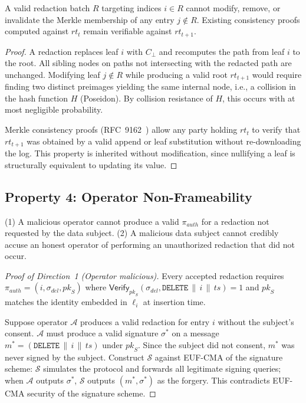 \begin{theorem}
  A valid redaction batch $R$ targeting indices $i \in R$ cannot modify,
  remove, or invalidate the Merkle membership of any entry $j \notin R$.
  Existing consistency proofs computed against $\mathit{rt}_t$ remain
  verifiable against $\mathit{rt}_{t+1}$.
\end{theorem}

\begin{proof}
A redaction replaces leaf $i$ with $C_{\bot}$ and recomputes the path
from leaf $i$ to the root. All sibling nodes on paths not intersecting
with the redacted path are unchanged. Modifying leaf $j \notin R$ while
producing a valid root $\mathit{rt}_{t+1}$ would require finding two
distinct preimages yielding the same internal node, i.e., a collision in
the hash function $H$ (Poseidon). By collision resistance of $H$, this
occurs with at most negligible probability.

Merkle consistency proofs (RFC~9162~\cite{rfc6962}) allow any party
holding $\mathit{rt}_t$ to verify that $\mathit{rt}_{t+1}$ was obtained
by a valid append or leaf substitution without re-downloading the log.
This property is inherited without modification, since nullifying a leaf
is structurally equivalent to updating its value.
\end{proof}

\subsection{Property 4: Operator Non-Frameability}
\label{subsec:nonframe}

\begin{theorem}
  (1) A malicious operator cannot produce a valid $\pi_{\mathit{auth}}$
  for a redaction not requested by the data subject. (2) A malicious
  data subject cannot credibly accuse an honest operator of performing an
  unauthorized redaction that did not occur.
\end{theorem}

\begin{proof}[Proof of Direction~1 (Operator malicious)]
Every accepted redaction requires $\pi_{\mathit{auth}} = (i,
\sigma_{\mathit{del}}, \mathit{pk}_S)$ where
$\mathsf{Verify}_{\mathit{pk}_S}(\sigma_{\mathit{del}},
\texttt{DELETE}\,\|\,i\,\|\,\mathit{ts}) = 1$ and $\mathit{pk}_S$ matches
the identity embedded in $\ell_i$ at insertion time.

Suppose operator $\mathcal{A}$ produces a valid redaction for entry $i$
without the subject's consent. $\mathcal{A}$ must produce a valid
signature $\sigma^*$ on a message $m^* = (\texttt{DELETE}\,\|\,i\,\|\,
\mathit{ts})$ under $\mathit{pk}_S$. Since the subject did not consent,
$m^*$ was never signed by the subject. Construct $\mathcal{S}$ against
EUF-CMA of the signature scheme: $\mathcal{S}$ simulates the protocol
and forwards all legitimate signing queries; when $\mathcal{A}$ outputs
$\sigma^*$, $\mathcal{S}$ outputs $(m^*, \sigma^*)$ as the forgery.
This contradicts EUF-CMA security of the signature scheme.
\end{proof}

